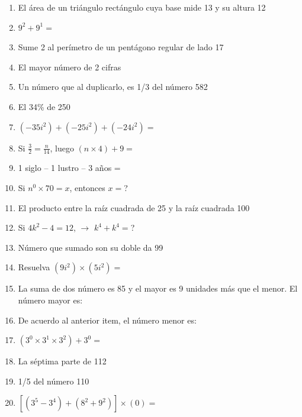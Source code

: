 \documentclass[letterpaper,11pt,twoside]{article}
\begin{document}
\begin{multicols}{2}
\begin{enumerate}
 \item El área de un triángulo rectángulo cuya base mide 13 y su altura 12
 \item $9^{2}+9^{1}=$
 \item Sume 2 al perímetro de un pentágono regular de lado 17
 \item El mayor número de 2 cifras
 \item Un número que al duplicarlo, es 1/3 del número 582
 \item El 34\% de 250
 \item $(-35i^{2})+(-25i^{2})+(-24i^{2})=$
 \item Si $\frac{3}{2}=\frac{n}{14}$, luego $(n\times 4)+9=$
 \item 1 siglo -- 1 lustro -- 3 años =
 \item Si $n^{0}\times 70=x$, entonces $x=$?
 \item El producto entre la raíz cuadrada de 25 y la raíz cuadrada 100
 \item Si $4k^{2}-4=12$, $\rightarrow$ $k^{4}+k^{4}=$?
 \item Número que sumado son su doble da 99
 \item Resuelva $(9i^{2})\times (5i^{2})=$
 \item La suma de dos número es 85 y el mayor es 9 unidades más que el menor. El número mayor es:
 \item De acuerdo al anterior item, el número menor es:
 \item $(3^{0}\times 3^{1}\times 3^{2})+3^{0}=$
 \item La séptima parte de 112
 \item 1/5 del número 110
 \item $[(3^{5}-3^{4})+(8^{2}+9^{2})]\times (0)=$
 \end{enumerate}

\end{multicols}
\end{document}
